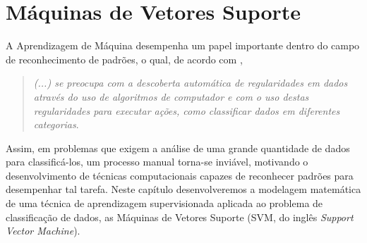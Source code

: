 \documentclass[12pt,a4paper]{scrartcl}
\def\RR{\mathds{R}}
\newtheorem{prop}{Proposição}
\theoremstyle{definition}%
\begin{document}



\newpage
\section{Máquinas de Vetores Suporte} \label{chap:maquinas_vetores_suporte}

A Aprendizagem de Máquina desempenha um papel importante dentro do campo de reconhecimento de padrões, o qual, de acordo com \textcite{bishop2016pattern},
\begin{quote}
    \textit{ (...) se preocupa com a descoberta automática de regularidades em dados através do uso de algoritmos de computador e com o uso destas regularidades para executar ações, como classificar dados em diferentes categorias}.
    \end{quote}
Assim, em problemas que exigem a análise de uma grande quantidade de dados para classificá-los, um processo manual torna-se inviável, motivando o desenvolvimento de técnicas computacionais capazes de reconhecer padrões para desempenhar tal tarefa. Neste capítulo desenvolveremos a modelagem matemática de uma técnica de aprendizagem supervisionada aplicada ao problema de classificação de dados, as Máquinas de Vetores Suporte (SVM, do inglês \textit{Support Vector Machine}). 
\end{document}
